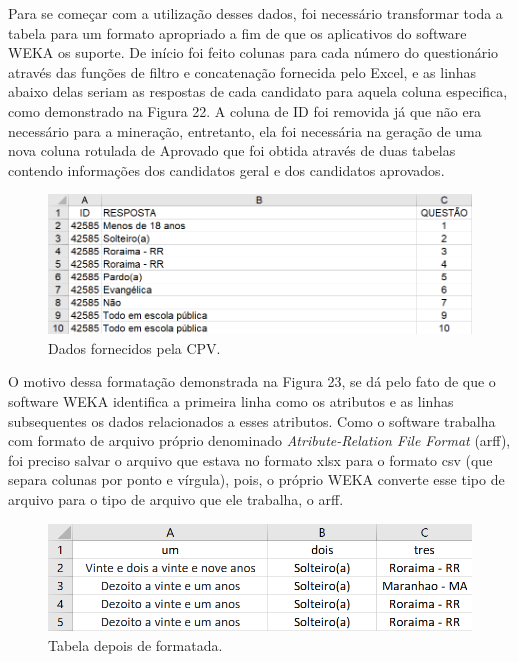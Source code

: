 \par
Para se começar com a utilização desses dados, foi necessário transformar toda a tabela para um formato apropriado a fim de que os aplicativos do software WEKA os suporte. De início foi feito colunas para cada número do questionário através das funções de filtro e concatenação fornecida pelo Excel, e as linhas abaixo delas seriam as respostas de cada candidato para aquela coluna especifica, como demonstrado na Figura 22. A coluna de ID foi removida já que não era necessário para a mineração, entretanto, ela foi necessária na geração de uma nova coluna rotulada de Aprovado que foi obtida através de duas tabelas contendo informações dos candidatos geral e dos candidatos aprovados.


\par
\begin{figure}[!htp]
	\begin{center}
    \caption{\label{fig:waveform_fig} Dados fornecidos pela CPV.}
	\includegraphics[scale=0.65]{Figuras/Formato_errado.png}
	\end{center}
\end{figure}

\par
O motivo dessa formatação demonstrada na Figura 23, se dá pelo fato de que o software WEKA identifica a primeira linha como os atributos e as linhas subsequentes os dados relacionados a esses atributos. Como o software trabalha com formato de arquivo próprio denominado \textit{Atribute-Relation File Format} (arff), foi preciso salvar o arquivo que estava no formato xlsx para o formato csv (que separa colunas por ponto e vírgula), pois, o próprio WEKA converte esse tipo de arquivo para o tipo de arquivo que ele trabalha, o arff.

\par
\begin{figure}[!htp]
	\begin{center}
    \caption{\label{fig:waveform_fig} Tabela depois de formatada.}
	\includegraphics[scale=0.65]{Figuras/Formato_certo.png}
	\end{center}
\end{figure}



